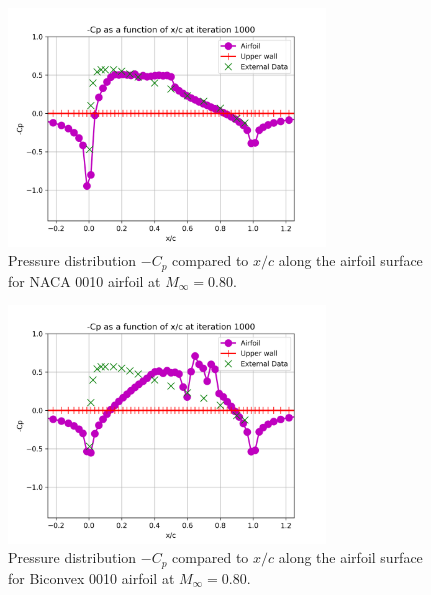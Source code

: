 \documentclass[12pt]{article}
\theoremstyle{definition}
\begin{document}
\begin{figure}
    \centering
    \includegraphics[width=0.75\textwidth,height=\textwidth,keepaspectratio]{images/pressure_coefficient-4.png}
    \caption{Pressure distribution $-C_p$ compared to $x/c$ along the airfoil surface for NACA 0010 airfoil at $M_\infty = 0.80$.}
    \label{fig:pressure_coefficient-4}
\end{figure}

\begin{figure}
    \centering
    \includegraphics[width=0.75\textwidth,height=\textwidth,keepaspectratio]{images/pressure_coefficient-5.png}
    \caption{Pressure distribution $-C_p$ compared to $x/c$ along the airfoil surface for Biconvex 0010 airfoil at $M_\infty = 0.80$.}
    \label{fig:pressure_coefficient-5}
\end{figure}
\end{document}
